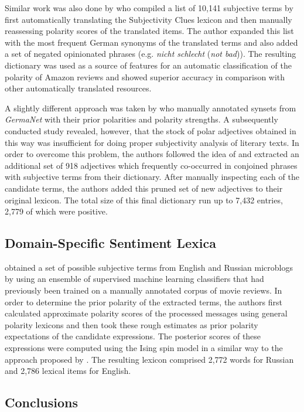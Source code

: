 Similar work was also done by \citet{Waltinger:10} who compiled a list
of 10,141 subjective terms by first automatically translating the
Subjectivity Clues lexicon \cite{Wilson:05} and then manually
reassessing polarity scores of the translated items.  The author
expanded this list with the most frequent German synonyms of the
translated terms and also added a set of negated opinionated phrases
(e.g. \emph{nicht schlecht} (\emph{not bad})).  The resulting
dictionary was used as a source of features for an automatic
classification of the polarity of Amazon reviews and showed superior
accuracy in comparison with other automatically translated resources.

A slightly different approach was taken by \citet{Clematide:10} who
manually annotated synsets from \emph{GermaNet} \cite{Hamp:97} with
their prior polarities and polarity strengths.  A subsequently
conducted study revealed, however, that the stock of polar adjectives
obtained in this way was insufficient for doing proper subjectivity
analysis of literary texts.  In order to overcome this problem, the
authors followed the idea of \citet{Hatzivassi:97} and extracted an
additional set of 918 adjectives which frequently co-occurred in
conjoined phrases with subjective terms from their dictionary.  After
manually inspecting each of the candidate terms, the authors added
this pruned set of new adjectives to their original lexicon.  The
total size of this final dictionary run up to 7,432 entries, 2,779 of
which were positive.

\subsection{Domain-Specific Sentiment Lexica}

\citet{Chetviorkin:14} obtained a set of possible subjective terms
from English and Russian microblogs by using an ensemble of supervised
machine learning classifiers that had previously been trained on a
manually annotated corpus of movie reviews.  In order to determine the
prior polarity of the extracted terms, the authors first calculated
approximate polarity scores of the processed messages using general
polarity lexicons and then took these rough estimates as prior
polarity expectations of the candidate expressions.  The posterior
scores of these expressions were computed using the Ising spin model
in a similar way to the approach proposed by \citet{Takamura:05}.  The
resulting lexicon comprised 2,772 words for Russian and 2,786 lexical
items for English.


\subsection{Conclusions}
